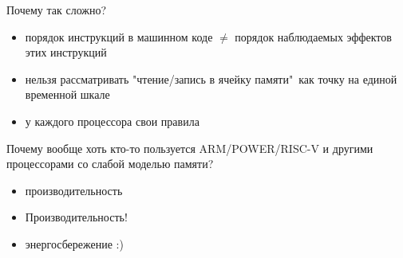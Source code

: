 % 
% 
% 
% 
% 
% 


\begin{frame}{Почему так сложно?}

\begin{itemize}
 \item порядок инструкций в машинном коде $\neq$ порядок наблюдаемых эффектов этих инструкций
 \item нельзя рассматривать "чтение/запись в ячейку памяти"\ как точку на единой временной шкале
 \item у каждого процессора свои правила
\end{itemize}

\pause
Почему вообще хоть кто-то пользуется ARM/POWER/RISC-V и другими процессорами со слабой моделью памяти?

\pause
\begin{itemize}
  \item производительность
  \pause
  \item Производительность!
  \pause
  \item энергосбережение :)
\end{itemize}

\end{frame}

